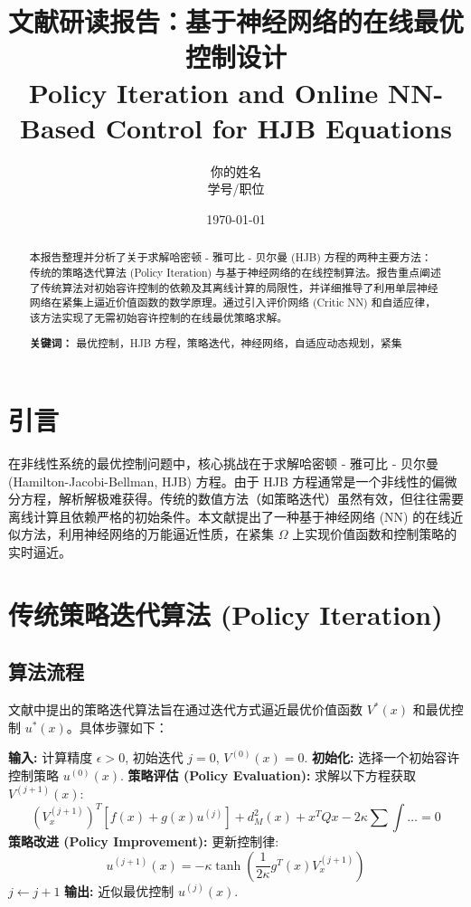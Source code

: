 \documentclass[a4paper,12pt]{article}
\title{\textbf{文献研读报告：基于神经网络的在线最优控制设计}\\ \large Policy Iteration and Online NN-Based Control for HJB Equations}
\author{你的姓名 \\ 学号/职位}
\date{\today}
\newcommand{\trans}{^T}
\begin{document}
\maketitle

\begin{abstract}
    本报告整理并分析了关于求解哈密顿 - 雅可比 - 贝尔曼 (HJB) 方程的两种主要方法：传统的策略迭代算法 (Policy Iteration) 与基于神经网络的在线控制算法。报告重点阐述了传统算法对初始容许控制的依赖及其离线计算的局限性，并详细推导了利用单层神经网络在紧集上逼近价值函数的数学原理。通过引入评价网络 (Critic NN) 和自适应律，该方法实现了无需初始容许控制的在线最优策略求解。
    
    \vspace{0.5em}
    \noindent\textbf{关键词：} 最优控制，HJB 方程，策略迭代，神经网络，自适应动态规划，紧集
\end{abstract}

\tableofcontents
\newpage

\section{引言}
在非线性系统的最优控制问题中，核心挑战在于求解哈密顿 - 雅可比 - 贝尔曼 (Hamilton-Jacobi-Bellman, HJB) 方程。由于 HJB 方程通常是一个非线性的偏微分方程，解析解极难获得。传统的数值方法（如策略迭代）虽然有效，但往往需要离线计算且依赖严格的初始条件。本文献提出了一种基于神经网络 (NN) 的在线近似方法，利用神经网络的万能逼近性质，在紧集 $\Omega$ 上实现价值函数和控制策略的实时逼近。

\section{传统策略迭代算法 (Policy Iteration)}

\subsection{算法流程}
文献中提出的策略迭代算法旨在通过迭代方式逼近最优价值函数 $V^*(x)$ 和最优控制 $u^*(x)$。具体步骤如下：

\begin{algorithm}[H]
\caption{策略迭代算法 (Policy Iteration Algorithm)}
\begin{algorithmic}[1]
\State \textbf{输入:} 计算精度 $\epsilon > 0$, 初始迭代 $j=0$, $V^{(0)}(x)=0$.
\State \textbf{初始化:} 选择一个初始容许控制策略 $u^{(0)}(x)$.
\Repeat
    \State \textbf{策略评估 (Policy Evaluation):} 求解以下方程获取 $V^{(j+1)}(x)$:
    \begin{equation}
        (V^{(j+1)}_x)\trans [f(x) + g(x)u^{(j)}] + d_M^2(x) + x\trans Q x - 2\kappa \sum \int \dots = 0
    \end{equation}
    \State \textbf{策略改进 (Policy Improvement):} 更新控制律:
    \begin{equation}
        u^{(j+1)}(x) = -\kappa \tanh \left( \frac{1}{2\kappa} g\trans(x) V^{(j+1)}_x \right)
    \end{equation}
    \State $j \leftarrow j + 1$
\State \textbf{输出:} 近似最优控制 $u^{(j)}(x)$.
\end{algorithmic}
\end{algorithm}
\end{document}
